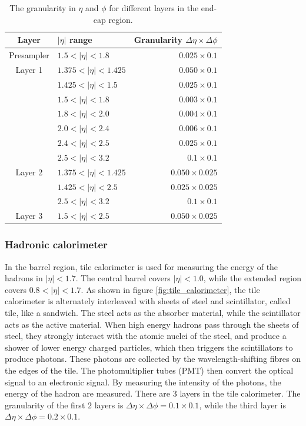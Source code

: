 \begin{table}[htpb]
\centering
\begin{tabular}{|c|l|r|}
\hline
Layer & $|\eta|$ range & Granularity $\Delta \eta \times \Delta \phi$ \\
\hline
\hline
Presampler & $1.5   < |\eta| < 1.8$   & $0.025 \times 0.1$ \\
\hline
Layer 1    & $1.375 < |\eta| < 1.425$ & $0.050 \times 0.1$ \\
           & $1.425 < |\eta| < 1.5$   & $0.025 \times 0.1$ \\
           & $1.5   < |\eta| < 1.8$   & $0.003 \times 0.1$ \\
           & $1.8   < |\eta| < 2.0$   & $0.004 \times 0.1$ \\
           & $2.0   < |\eta| < 2.4$   & $0.006 \times 0.1$ \\
           & $2.4   < |\eta| < 2.5$   & $0.025 \times 0.1$ \\
           & $2.5   < |\eta| < 3.2$   & $0.1   \times 0.1$ \\
\hline
Layer 2    & $1.375 < |\eta| < 1.425$ & $0.050 \times 0.025$ \\
           & $1.425 < |\eta| < 2.5$   & $0.025 \times 0.025$ \\
           & $2.5   < |\eta| < 3.2$   & $0.1   \times 0.1$ \\
\hline
Layer 3    & $1.5   < |\eta| < 2.5$   & $0.050 \times 0.025$ \\
\hline
\end{tabular}
\caption{The granularity in $\eta$ and $\phi$ for different layers in the end-cap region. \cite{ATLAS_doc}}
\label{tab:granularity_EM_endcap}
\end{table}

\subsubsection{Hadronic calorimeter}
In the barrel region, tile calorimeter is used for measuring the energy of the hadrons in $|\eta| < 1.7$.
The central barrel covers $|\eta| < 1.0$, while the extended region covers $0.8 < |\eta| < 1.7$.
As shown in figure \ref{fig:tile_calorimeter}, the tile calorimeter is alternately interleaved with sheets of steel and scintillator, called tile, like a sandwich.
The steel acts as the absorber material, while the scintillator acts as the active material.
When high energy hadrons pass through the sheets of steel, they strongly interact with the atomic nuclei of the steel, and produce a shower of lower energy charged particles, which then triggers the scintillators to produce photons.
These photons are collected by the wavelength-shifting fibres on the edges of the tile.
The photomultiplier tubes (PMT) then convert the optical signal to an electronic signal.
By measuring the intensity of the photons, the energy of the hadron are measured.
There are 3 layers in the tile calorimeter.
The granularity of the first 2 layers is $\Delta \eta \times \Delta \phi = 0.1 \times 0.1$, while the third layer is $\Delta \eta \times \Delta \phi = 0.2 \times 0.1$.

